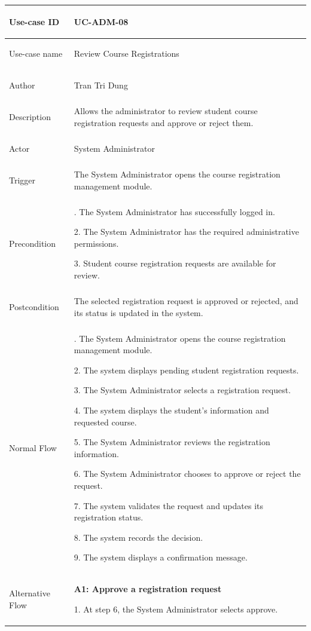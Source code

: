 \begin{longtable}{|>{\bfseries\raggedright\arraybackslash}p{}|>{\raggedright\arraybackslash}p{}|}
\hline
Use-case ID & UC-ADM-08 \\ \hline
Use-case name & Review Course Registrations \\ \hline
Author & Tran Tri Dung \\ \hline
Description & Allows the administrator to review student course registration requests and approve or reject them. \\ \hline
Actor & System Administrator \\ \hline
Trigger & The System Administrator opens the course registration management module. \\ \hline
Precondition &
1. The System Administrator has successfully logged in. \par
2. The System Administrator has the required administrative permissions. \par
3. Student course registration requests are available for review. \\ \hline
Postcondition & The selected registration request is approved or rejected, and its status is updated in the system. \\ \hline
Normal Flow &
1. The System Administrator opens the course registration management module. \par
2. The system displays pending student registration requests. \par
3. The System Administrator selects a registration request. \par
4. The system displays the student's information and requested course. \par
5. The System Administrator reviews the registration information. \par
6. The System Administrator chooses to approve or reject the request. \par
7. The system validates the request and updates its registration status. \par
8. The system records the decision. \par
9. The system displays a confirmation message. \\ \hline
Alternative Flow &
\textbf{A1: Approve a registration request} \par
1. At step 6, the System Administrator selects approve. \par

\end{longtable}
